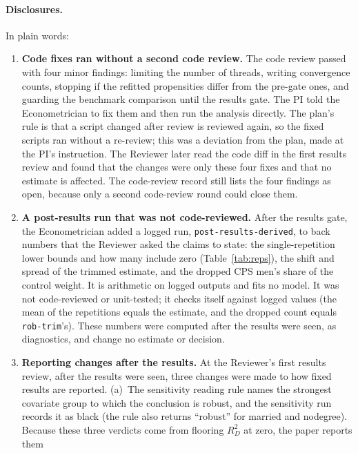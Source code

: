 \documentclass[11pt]{article}
\newcommand{\run}[1]{\texttt{#1}}
\begin{document}
\paragraph{Disclosures.} In plain words:
\begin{enumerate}
  \setlength{\itemsep}{1pt}
  \item \textbf{Code fixes ran without a second code review.} The code review passed with
        four minor findings: limiting the number of threads, writing convergence counts,
        stopping if the refitted propensities differ from the pre-gate ones, and guarding the
        benchmark comparison until the results gate. The PI told the Econometrician to fix
        them and then run the analysis directly. The plan's rule is that a script changed after
        review is reviewed again, so the fixed scripts ran without a re-review; this was a
        deviation from the plan, made at the PI's instruction. The Reviewer later read the
        code diff in the first results review and found that the changes were only these four
        fixes and that no estimate is affected. The code-review record still lists the four
        findings as open, because only a second code-review round could close them.
  \item \textbf{A post-results run that was not code-reviewed.} After the results gate, the
        Econometrician added a logged run, \run{post-results-derived}, to back numbers that the
        Reviewer asked the claims to state: the single-repetition lower bounds and how many
        include zero (Table~\ref{tab:reps}), the shift and spread of the trimmed estimate, and
        the dropped CPS men's share of the control weight. It is arithmetic on logged outputs
        and fits no model. It was not code-reviewed or unit-tested; it checks itself against
        logged values (the mean of the repetitions equals the estimate, and the dropped count
        equals \run{rob-trim}'s). These numbers were computed after the results were seen, as
        diagnostics, and change no estimate or decision.
  \item \textbf{Reporting changes after the results.} At the Reviewer's first results
        review, after the results were seen, three changes were made to how fixed results
        are reported. (a)~The sensitivity reading rule names
        the strongest covariate group to which the conclusion is robust, and the sensitivity
        run records it as black (the rule also returns ``robust'' for married and nodegree).
        Because these three verdicts come from flooring $R^2_D$ at zero, the paper reports them

\end{enumerate}
\end{document}
